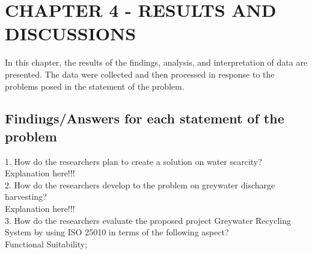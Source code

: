 


\chapter{\uppercase {\textbf{Chapter 4 - Results and Discussions}}}

In this chapter, the results of the findings, analysis, and interpretation of data are presented. The data were collected and then processed in response to the problems posed in the statement of the problem. \\

\section{Findings/Answers for each statement of the problem}

1. How do the researchers plan to create a solution on water scarcity? \\

Explanation here!!! \lipsum[1] \\

2. How do the researchers develop to the problem on greywater discharge harvesting? \\

Explanation here!!! \lipsum[1] \\

3. How do the researchers evaluate the proposed project Greywater Recycling System by using ISO 25010 in terms of the following aspect? \\

\indent\indent Functional Suitability; \\

